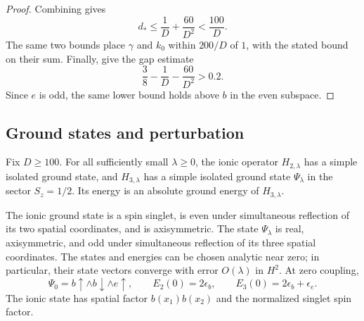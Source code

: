 \begin{proof}
Combining 
gives
\[
 d_*\le\frac1D+\frac{60}{D^2}<\frac{100}{D}.
\]
The same two bounds place \(\gamma\) and \(k_0\) within
\(200/D\) of \(1\), with the stated bound on their sum.  Finally,
 give the
gap estimate
\[
 \frac38-\frac1D-\frac{60}{D^2}>0.2 .
\]
Since \(e\) is odd, the same lower bound holds above \(b\) in the
even subspace.
\end{proof}

\subsection{Ground states and perturbation}

\begin{proposition}
\label{prop:small-coupling}
Fix \(D\ge100\).  For all sufficiently small \(\lambda\ge0\), the
ionic operator \(H_{2,\lambda}\) has a simple isolated ground state,
and \(H_{3,\lambda}\) has a simple isolated ground state
\(\Psi_\lambda\) in the sector \(S_z=1/2\).  Its energy is an absolute
ground energy of \(H_{3,\lambda}\).

The ionic ground state is a spin singlet, is even under simultaneous
reflection of its two spatial coordinates, and is axisymmetric.
The state \(\Psi_\lambda\) is real, axisymmetric, and odd under
simultaneous reflection of its three spatial coordinates.
The states and energies can be chosen analytic near zero; in
particular, their state vectors converge with error \(O(\lambda)\)
in \(H^2\).  At zero coupling,
\begin{equation}
 \Psi_0=b\uparrow\wedge b\downarrow\wedge e\uparrow,\qquad
 E_2(0)=2\epsilon_b,\qquad
 E_3(0)=2\epsilon_b+\epsilon_e .
 \label{eq:zero-coupling-states}
\end{equation}
The ionic state has spatial factor \(b(x_1)b(x_2)\) and the normalized
singlet spin factor.
\end{proposition}

